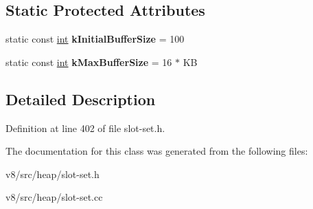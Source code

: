 \subsection*{Static Protected Attributes}
\begin{DoxyCompactItemize}
\item 
\mbox{\label{classv8_1_1internal_1_1TypedSlots_a7b4fdd0a99f0f0496054261a1b2519c6}} 
static const \mbox{\hyperlink{classint}{int}} {\bfseries k\+Initial\+Buffer\+Size} = 100
\item 
\mbox{\label{classv8_1_1internal_1_1TypedSlots_a11084615d9d27deac4ec7ed14ac77bb0}} 
static const \mbox{\hyperlink{classint}{int}} {\bfseries k\+Max\+Buffer\+Size} = 16 $\ast$ KB
\end{DoxyCompactItemize}


\subsection{Detailed Description}


Definition at line 402 of file slot-\/set.\+h.



The documentation for this class was generated from the following files\+:\begin{DoxyCompactItemize}
\item 
v8/src/heap/slot-\/set.\+h\item 
v8/src/heap/slot-\/set.\+cc\end{DoxyCompactItemize}
